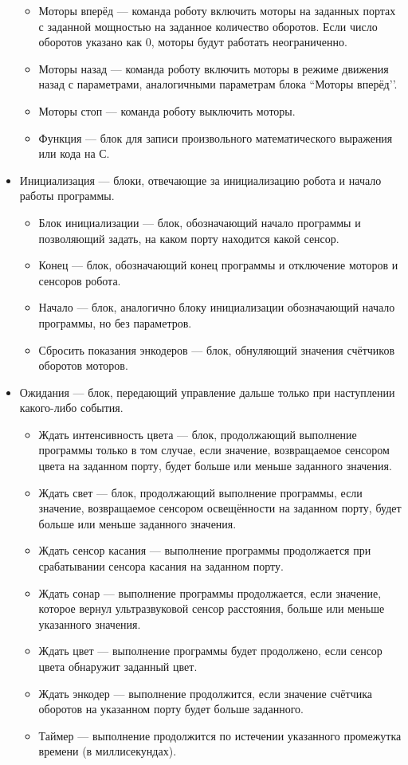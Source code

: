 \documentclass[a4paper]{article}
\begin{document}
\begin{itemize}
\begin{itemize}
    \item Моторы вперёд --- команда роботу включить моторы на заданных портах с заданной мощностью на заданное количество оборотов. Если число оборотов указано как 0, моторы будут работать неограниченно.
    \item Моторы назад --- команда роботу включить моторы в режиме движения назад с параметрами, аналогичными параметрам блока ``Моторы вперёд’’.
    \item Моторы стоп --- команда роботу выключить моторы.
    \item Функция --- блок для записи произвольного математического выражения или кода на С.
  \end{itemize}
  \item Инициализация --- блоки, отвечающие за инициализацию робота и начало работы программы.
  \begin{itemize}
    \item Блок инициализации --- блок, обозначающий начало программы и позволяющий задать, на каком порту находится какой сенсор.
    \item Конец --- блок, обозначающий конец программы и отключение моторов и сенсоров робота.
    \item Начало --- блок, аналогично блоку инициализации обозначающий начало программы, но без параметров.
    \item Сбросить показания энкодеров --- блок, обнуляющий значения счётчиков оборотов моторов.
  \end{itemize}
  \item Ожидания --- блок, передающий управление дальше только при наступлении какого-либо события.
  \begin{itemize}
    \item Ждать интенсивность цвета --- блок, продолжающий выполнение программы только в том случае, если значение, возвращаемое сенсором цвета на заданном порту, будет больше или меньше заданного значения.
    \item Ждать свет --- блок, продолжающий выполнение программы, если значение, возвращаемое сенсором освещённости на заданном порту, будет больше или меньше заданного значения.
    \item Ждать сенсор касания --- выполнение программы продолжается при срабатывании сенсора касания на заданном порту.
    \item Ждать сонар --- выполнение программы продолжается, если значение, которое вернул ультразвуковой сенсор расстояния, больше или меньше указанного значения.
    \item Ждать цвет --- выполнение программы будет продолжено, если сенсор цвета обнаружит заданный цвет.
    \item Ждать энкодер --- выполнение продолжится, если значение счётчика оборотов на указанном порту будет больше заданного.
    \item Таймер --- выполнение продолжится по истечении указанного промежутка времени (в миллисекундах).
  \end{itemize}
\end{itemize}
\end{document}
